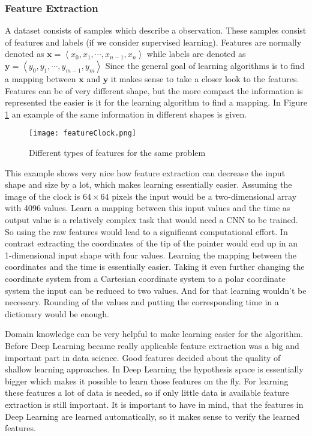 \subsubsection{Feature Extraction}\label{ssec:featureExtracion}
A dataset consists of samples which describe a observation.
These samples consist of features and labels (if we consider supervised learning). Features are normally denoted as 
$\mathbf{x} = \left\langle x_{0}, x_{1}, \cdots , x_{n-1}, x_{n} \right\rangle$ while labels are denoted as $\mathbf{y} = \left\langle y_{0}, y_{1}, \cdots , y_{m-1}, y_{m} \right\rangle$
Since the general goal of learning algorithms is to find a mapping between $\mathbf{x}$ and $\mathbf{y}$ it makes sense to take a closer look to the features.
Features can be of very different shape, but the more compact the information is represented the easier is it for the learning algorithm to find a mapping.
In Figure \ref{fig:featureClock} an example of the same information in different shapes is given.  
\begin{figure}
\centering
  \texttt{[image: featureClock.png]}
  \caption{Different types of features for the same problem \cite{CholDeep2018}}
  \label{fig:featureClock}
\end{figure}
This example shows very nice how feature extraction can decrease the input shape and size by a lot, which makes learning essentially easier. 
Assuming the image of the clock is $64 \times 64$ pixels the input would be a two-dimensional array with 4096 values.
Learn a mapping between this input values and the time as output value is a relatively complex task that would need a CNN to be trained. 
So using the raw features would lead to a significant computational effort.
In contrast extracting the coordinates of the tip of the pointer would end up in an 1-dimensional input shape with four values. 
Learning the mapping between the coordinates and the time is essentially easier.
Taking it even further changing the coordinate system from a Cartesian coordinate system to a polar coordinate system the input can be reduced to two values.
And for that learning wouldn't be necessary. Rounding of the values and putting the corresponding time in a dictionary would be enough.

Domain knowledge can be very helpful to make learning easier for the algorithm.
Before Deep Learning became really applicable feature extraction was a big and important part in data science.
Good features decided about the quality of shallow learning approaches.
In Deep Learning the hypothesis space is essentially bigger which makes it possible to learn those features on the fly.
For learning these features a lot of data is needed, so if only little data is available feature extraction is still important.
It is important to have in mind, that the features in Deep Learning are learned automatically, so it makes sense to verify the learned features. 

